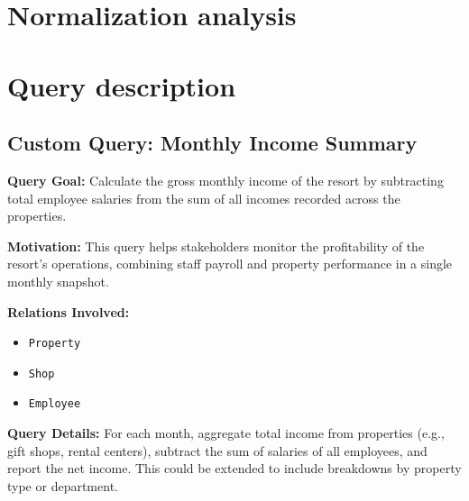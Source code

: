 \documentclass[11pt]{scrartcl}
\begin{document}
\section{Normalization analysis}

\section{Query description}
\subsection{Custom Query: Monthly Income Summary}

\textbf{Query Goal:} Calculate the gross monthly income of the resort by subtracting total employee salaries from the sum of all incomes recorded across the properties.

\textbf{Motivation:} This query helps stakeholders monitor the profitability of the resort’s operations, combining staff payroll and property performance in a single monthly snapshot.

\textbf{Relations Involved:}
\begin{itemize}
  \item \texttt{Property}
  \item \texttt{Shop}
  \item \texttt{Employee}
\end{itemize}

\textbf{Query Details:} For each month, aggregate total income from properties (e.g., gift shops, rental centers), subtract the sum of salaries of all employees, and report the net income. This could be extended to include breakdowns by property type or department.
\end{document}
